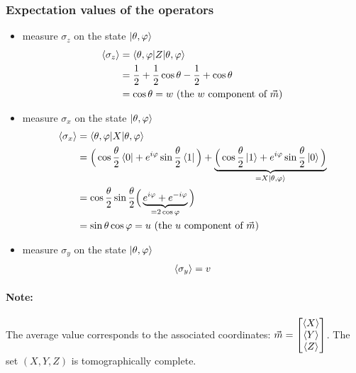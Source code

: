 \documentclass{article}
\begin{document}
\subsubsection*{Expectation values of the operators}
\begin{itemize}[label=-]
    \item measure $\sigma_z$ on the state $\ket{\theta, \varphi}$
    \begin{equation}
        \begin{aligned}
            \braket{\sigma_z}
                & = \braket{\theta, \varphi|Z|\theta, \varphi} \\
                & = \frac{1}{2} + \frac{1}{2}\cos\theta - \frac{1}{2} + \cos\theta \\
                & = \cos \theta = w \text{  (the $w$ component of $\vec{m}$)}
        \end{aligned}
    \end{equation}
    \item measure $\sigma_x$ on the state $\ket{\theta, \varphi}$
    \begin{equation}
        \begin{aligned}
            \braket{\sigma_x}
                & = \braket{\theta, \varphi|X|\theta, \varphi} \\
                & = \Big(\cos\frac{\theta}{2}\bra{0}+e^{i\varphi}\sin\frac{\theta}{2}\bra{1}\Big)
                    + \underbrace{\Big(\cos\frac{\theta}{2}\ket{1}+e^{i\varphi}\sin\frac{\theta}{2}
                    \ket{0}\Big)}_{=X\ket{\theta, \varphi}} \\
                & = \cos\frac{\theta}{2}\sin\frac{\theta}{2}
                    \Big(\underbrace{e^{i\varphi}+e^{-i\varphi}}_{=2\cos\varphi}\Big)\\
                & = \sin\theta\cos\varphi = u \text{  (the $u$ component of $\vec{m}$)}
        \end{aligned}
    \end{equation}
    \item measure $\sigma_y$ on the state $\ket{\theta, \varphi}$
    \begin{equation}
        \begin{aligned}
            \braket{\sigma_y} = v
        \end{aligned}
    \end{equation}
\end{itemize}


\paragraph{Note: } The average value corresponds to the associated coordinates:
 $\vec{m} = \begin{bmatrix} \braket{X} \\ \braket{Y} \\ \braket{Z}
 \end{bmatrix}$. The set $(X, Y, Z)$ is tomographically complete.
\end{document}
